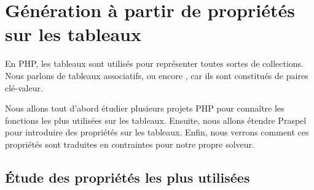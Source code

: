 \section{Génération à partir de propriétés sur les tableaux}
\label{section:data:arrays}

En PHP, les tableaux sont utilisés pour représenter toutes sortes de
collections. Nous parlons de tableaux associatifs, ou encore
, car ils sont constitués de paires clé-valeur.

Nous allons tout d'abord étudier plusieurs projets PHP pour connaître les
fonctions les plus utilisées sur les tableaux. Ensuite, nous allons étendre
Praspel pour introduire des propriétés sur les tableaux. Enfin, nous verrons
comment ces propriétés sont traduites en contraintes pour notre propre solveur.

\subsection{Étude des propriétés les plus utilisées}

